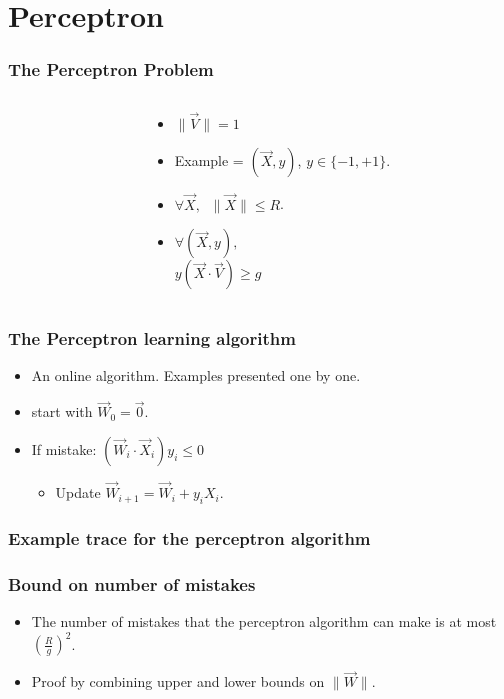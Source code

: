 \documentclass{beamer}
\newcommand{\W}{\vec{W}}
\newcommand{\V}{\vec{V}}
\newcommand{\X}{\vec{X}}
\begin{document}

\section{Perceptron}

\begin{frame}
\frametitle{The Perceptron Problem}
\begin{columns}
\begin{column}[T]{5.2cm}
\end{column}

\begin{column}[T]{4cm}
\begin{itemize}
\item
$\| \V \| =1$
\item 
Example = $(\X,y)$, $y \in \{-1,+1\}$.
\item
$\forall \X,\;\; \| \X \| \leq R$.
\item
$\forall (\X,y),$\\$y(\X \cdot \V) \geq g$
\end{itemize}
\end{column}
\end{columns}

\end{frame}

\begin{frame}
\frametitle{The Perceptron learning algorithm}
\begin{itemize}
\item An online algorithm. Examples presented one by one.
\item start with $\W_0 = \vec{0}$.
\item If mistake: $(\W_i \cdot \X_i) y_i \leq  0$
\begin{itemize}
\item Update $\W_{i+1} = \W_i + y_i X_i$.
\end{itemize}
\end{itemize}
\end{frame}

\begin{frame}
\frametitle{Example trace for the perceptron algorithm}
\end{frame}

\begin{frame}
\frametitle{Bound on number of mistakes}
\begin{itemize}
\item The number of mistakes that the perceptron algorithm can make is at most
$\left(\frac{R}{g}\right)^2$.
\item Proof by combining upper and lower bounds on $\| \W \|$.
\end{itemize}
\end{frame}
\end{document}
